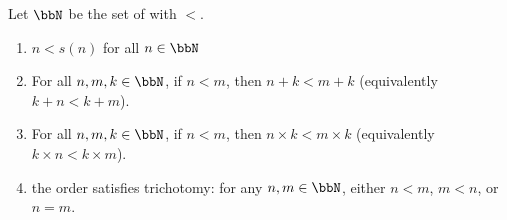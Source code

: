 \begin{proposition} \label{proposition:natural_numbers_order_compatibility}
Let $\bbN$ be the set of  with  $<$. 
\begin{enumerate}
    \item $n < s(n)$ for all $n \in \bbN$
    \item For all $n, m, k \in \bbN$, if $n < m$, then $n + k < m + k$ (equivalently $k + n < k + m$).
    \item For all $n, m, k \in \bbN$, if $n < m$, then $n \times k < m \times k$ (equivalently $k \times n < k \times m$).
    \item the order satisfies trichotomy: for any $n, m \in \bbN$, either $n < m$, $m < n$, or $n = m$.
\end{enumerate}
\end{proposition}

